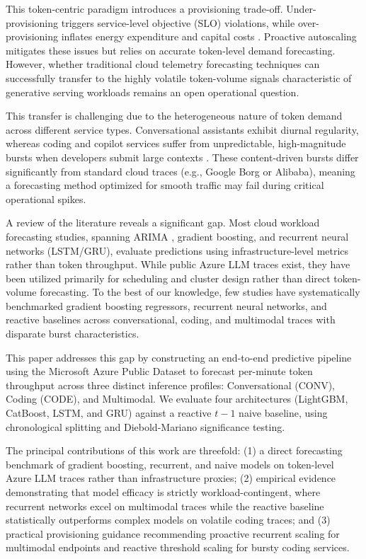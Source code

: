 \documentclass[conference, a4paper]{IEEEtran}
\begin{document}
This token-centric paradigm introduces a provisioning trade-off. Under-provisioning triggers service-level objective (SLO) violations, while over-provisioning inflates energy expenditure and capital costs \cite{stojkovic2025dynamollm, phalak2023sirm}. Proactive autoscaling mitigates these issues but relies on accurate token-level demand forecasting. However, whether traditional cloud telemetry forecasting techniques can successfully transfer to the highly volatile token-volume signals characteristic of generative serving workloads remains an open operational question.

This transfer is challenging due to the heterogeneous nature of token demand across different service types. Conversational assistants exhibit diurnal regularity, whereas coding and copilot services suffer from unpredictable, high-magnitude bursts when developers submit large contexts \cite{stojkovic2025dynamollm}. These content-driven bursts differ significantly from standard cloud traces (e.g., Google Borg or Alibaba), meaning a forecasting method optimized for smooth traffic may fail during critical operational spikes.

A review of the literature reveals a significant gap. Most cloud workload forecasting studies, spanning ARIMA \cite{janardhanan2017cpu}, gradient boosting, and recurrent neural networks (LSTM/GRU), evaluate predictions using infrastructure-level metrics rather than token throughput. While public Azure LLM traces exist, they have been utilized primarily for scheduling and cluster design rather than direct token-volume forecasting. To the best of our knowledge, few studies have systematically benchmarked gradient boosting regressors, recurrent neural networks, and reactive baselines across conversational, coding, and multimodal traces with disparate burst characteristics.
 

This paper addresses this gap by constructing an end-to-end predictive pipeline using the Microsoft Azure Public Dataset to forecast per-minute token throughput across three distinct inference profiles: Conversational (CONV), Coding (CODE), and Multimodal. We evaluate four architectures (LightGBM, CatBoost, LSTM, and GRU) against a reactive $t-1$ naive baseline, using chronological splitting and Diebold-Mariano significance testing.

The principal contributions of this work are threefold: (1) a direct forecasting benchmark of gradient boosting, recurrent, and naive models on token-level Azure LLM traces rather than infrastructure proxies; (2) empirical evidence demonstrating that model efficacy is strictly workload-contingent, where recurrent networks excel on multimodal traces while the reactive baseline statistically outperforms complex models on volatile coding traces; and (3) practical provisioning guidance recommending proactive recurrent scaling for multimodal endpoints and reactive threshold scaling for bursty coding services.
\end{document}
